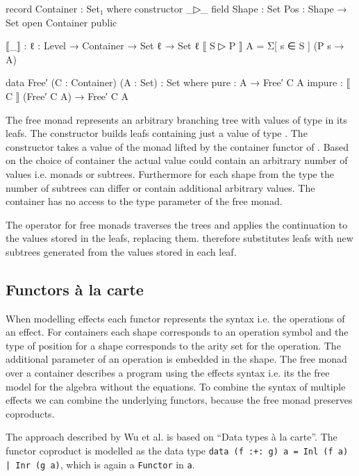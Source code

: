 \begin{code}[hide]
record Container : Set₁ where
  constructor _▷_
  field
    Shape : Set
    Pos : Shape → Set
open Container public

⟦_⟧ : {ℓ : Level} → Container → Set ℓ → Set ℓ
⟦ S ▷ P ⟧ A = Σ[ s ∈ S ] (P s → A)
\end{code}
\begin{code}
data Free′ (C : Container) (A : Set) : Set where
  pure : A → Free′ C A
  impure : ⟦ C ⟧ (Free′ C A) → Free′ C A
\end{code}
The free monad represents an arbitrary branching tree with values of type
 in its leafs.
The  constructor builds leafs containing just
a value of type .
The  constructor takes a value of the
 monad lifted by the container functor of .
Based on the choice of container the actual value could contain an arbitrary
number of values i.e.  monads or subtrees.
Furthermore for each shape from the  type the number of
subtrees can differ or contain additional arbitrary values.
The container has no access to the type parameter of the free monad.

The \AgdaFunction{>>=} operator for free monads traverses the trees and applies
the continuation to the values stored in the leafs, replacing them.
\AgdaFunction{>>=} therefore substitutes leafs with new subtrees generated from
the values stored in each leaf.

\subsection{Functors {\`{a}} la carte}

When modelling effects each functor represents the syntax i.e. the operations of
an effect.
For containers each shape corresponds to an operation symbol and the
type of position for a shape corresponds to the arity set for the operation.
The additional parameter of an operation is embedded in the shape.
The free monad over a container describes a program using the effects syntax
i.e. its the free model for the algebra without the equations.
To combine the syntax of multiple effects we can combine the underlying
functors, because the free monad preserves coproducts.


The approach described by Wu et al. is based on ``Data types {\`{a}} la
carte''\cite{DBLP:journals/jfp/Swierstra08}.
The functor coproduct is modelled as the data type \texttt{data (f :+: g) a =
  Inl (f a) | Inr (g a)}, which is again a \texttt{Functor} in \texttt{a}.

